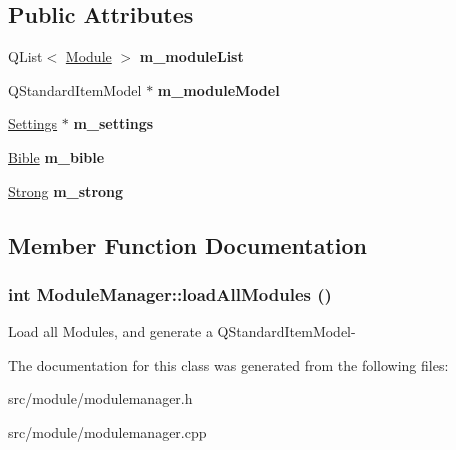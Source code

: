 \subsection*{Public Attributes}
\begin{DoxyCompactItemize}
\item 
\hypertarget{classModuleManager_a49564c04fb819e41b25c30ac6f200a6c}{
QList$<$ \hyperlink{classModule}{Module} $>$ {\bfseries m\_\-moduleList}}
\label{classModuleManager_a49564c04fb819e41b25c30ac6f200a6c}

\item 
\hypertarget{classModuleManager_ac87b3bd3ff5355c59782f16b24e83118}{
QStandardItemModel $\ast$ {\bfseries m\_\-moduleModel}}
\label{classModuleManager_ac87b3bd3ff5355c59782f16b24e83118}

\item 
\hypertarget{classModuleManager_a9b7b310a9ccdc0a7d438631af2d15120}{
\hyperlink{classSettings}{Settings} $\ast$ {\bfseries m\_\-settings}}
\label{classModuleManager_a9b7b310a9ccdc0a7d438631af2d15120}

\item 
\hypertarget{classModuleManager_a2d836395b4fd084ce2b813898a0bfc90}{
\hyperlink{classBible}{Bible} {\bfseries m\_\-bible}}
\label{classModuleManager_a2d836395b4fd084ce2b813898a0bfc90}

\item 
\hypertarget{classModuleManager_ad70d860a9b77caade59a097c9c28f399}{
\hyperlink{classStrong}{Strong} {\bfseries m\_\-strong}}
\label{classModuleManager_ad70d860a9b77caade59a097c9c28f399}

\end{DoxyCompactItemize}


\subsection{Member Function Documentation}
\hypertarget{classModuleManager_a5ede22110fa3280a3b08638c91cbc026}{
\subsubsection[{loadAllModules}]{\setlength{\rightskip}{0pt plus 5cm}int ModuleManager::loadAllModules ()}}
\label{classModuleManager_a5ede22110fa3280a3b08638c91cbc026}
Load all Modules, and generate a QStandardItemModel-\/ 

The documentation for this class was generated from the following files:\begin{DoxyCompactItemize}
\item 
src/module/modulemanager.h\item 
src/module/modulemanager.cpp\end{DoxyCompactItemize}
